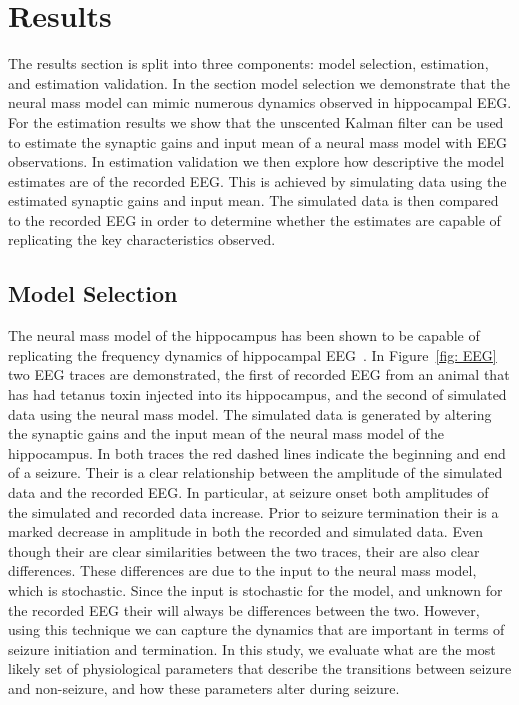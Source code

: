 \section{Results}

The results section is split into three components: model selection, estimation, and estimation validation. In the section model selection we demonstrate that the neural mass model can mimic numerous dynamics observed in hippocampal EEG. For the estimation results we show that the unscented Kalman filter can be used to estimate the synaptic gains and input mean of a neural mass model with EEG observations. In estimation validation we then explore how descriptive the model estimates are of the recorded EEG. This is achieved by simulating data using the estimated synaptic gains and input mean. The simulated data is then compared to the recorded EEG in order to determine whether the estimates are capable of replicating the key characteristics observed.

\subsection{Model Selection}

The neural mass model of the hippocampus has been shown to be capable of replicating the frequency dynamics of hippocampal EEG~\citep{wendling2002epileptic}. In Figure~\ref{fig: EEG} two EEG traces are demonstrated, the first of recorded EEG from an animal that has had tetanus toxin injected into its hippocampus, and the second of simulated data using the neural mass model. The simulated data is generated by altering the synaptic gains and the input mean of the neural mass model of the hippocampus. In both traces the red dashed lines indicate the beginning and end of a seizure. Their is a clear relationship between the amplitude of the simulated data and the recorded EEG. In particular, at seizure onset both amplitudes of the simulated and recorded data increase. Prior to seizure termination their is a marked decrease in amplitude in both the recorded and simulated data. 
Even though their are clear similarities between the two traces, their are also clear differences. These differences are due to the input to the neural mass model, which is stochastic. Since the input is stochastic for the model, and unknown for the recorded EEG their will always be differences between the two. However, using this technique we can capture the dynamics that are important in terms of seizure initiation and termination. In this study, we evaluate what are the most likely set of physiological parameters that describe the transitions between seizure and non-seizure, and how these parameters alter during seizure.

